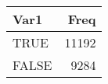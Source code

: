 
\begin{tabular}[t]{lr}
\toprule
Var1 & Freq\\
\midrule
TRUE & 11192\\
FALSE & 9284\\
\bottomrule
\end{tabular}